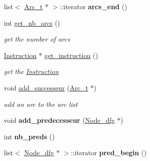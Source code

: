 \begin{DoxyCompactItemize}
\item 
\hypertarget{class_node__dfg_a5a49217bcb16aaf7e94e4e156d9a9d53}{list$<$ \hyperlink{struct_arc__t}{Arc\-\_\-t} $\ast$ $>$\-::iterator {\bfseries arcs\-\_\-end} ()}\label{class_node__dfg_a5a49217bcb16aaf7e94e4e156d9a9d53}

\item 
\hypertarget{class_node__dfg_a85d42a5cc1d6feacf403a8569a813074}{int \hyperlink{class_node__dfg_a85d42a5cc1d6feacf403a8569a813074}{get\-\_\-nb\-\_\-arcs} ()}\label{class_node__dfg_a85d42a5cc1d6feacf403a8569a813074}

\begin{DoxyCompactList}\small\item\em get the number of arcs \end{DoxyCompactList}\item 
\hypertarget{class_node__dfg_a8f20c21a0ffb2e224cc426148362c249}{\hyperlink{class_instruction}{Instruction} $\ast$ \hyperlink{class_node__dfg_a8f20c21a0ffb2e224cc426148362c249}{get\-\_\-instruction} ()}\label{class_node__dfg_a8f20c21a0ffb2e224cc426148362c249}

\begin{DoxyCompactList}\small\item\em get the \hyperlink{class_instruction}{Instruction} \end{DoxyCompactList}\item 
\hypertarget{class_node__dfg_add9d669804bc8ad4a4b806221d9ef9e9}{void \hyperlink{class_node__dfg_add9d669804bc8ad4a4b806221d9ef9e9}{add\-\_\-successeur} (\hyperlink{struct_arc__t}{Arc\-\_\-t} $\ast$)}\label{class_node__dfg_add9d669804bc8ad4a4b806221d9ef9e9}

\begin{DoxyCompactList}\small\item\em add an arc to the arc list \end{DoxyCompactList}\item 
\hypertarget{class_node__dfg_a8cc89b32dbe15bcf399725955a643551}{void {\bfseries add\-\_\-predecesseur} (\hyperlink{class_node__dfg}{Node\-\_\-dfg} $\ast$)}\label{class_node__dfg_a8cc89b32dbe15bcf399725955a643551}

\item 
\hypertarget{class_node__dfg_adef5e6e3362133f6adb38d404c8d8cf6}{int {\bfseries nb\-\_\-preds} ()}\label{class_node__dfg_adef5e6e3362133f6adb38d404c8d8cf6}

\item 
\hypertarget{class_node__dfg_a769af0d7836679d6ee9abcc55d399887}{list$<$ \hyperlink{class_node__dfg}{Node\-\_\-dfg} $\ast$ $>$\-::iterator {\bfseries pred\-\_\-begin} ()}\label{class_node__dfg_a769af0d7836679d6ee9abcc55d399887}


\end{DoxyCompactItemize}

